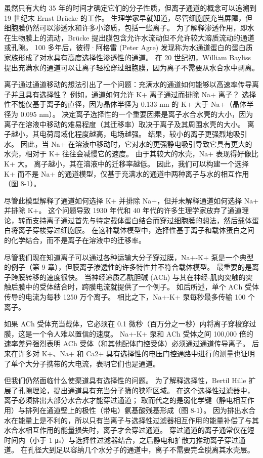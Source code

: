 虽然只有大约 35 年的时间才确定它们的分子性质，但离子通道的概念可以追溯到 19 世纪末 Ernst Brücke 的工作。 生理学家早就知道，尽管细胞膜充当屏障，但细胞膜仍然可以渗透水和许多小溶质，包括一些离子。 为了解释渗透作用，即水在生物膜上的流动，Brücke 提出膜包含允许水流动但不允许较大溶质流动的通道或孔隙。 100 多年后，彼得·阿格雷 (Peter Agre) 发现称为水通道蛋白的蛋白质家族形成了对水具有高度选择性渗透性的通道。 在 20 世纪初，William Bayliss 提出充满水的通道可以让离子轻松穿过细胞膜，因为离子不需要从水合水中剥离。

离子通过通道移动的想法引出了一个问题：充满水的通道如何能够以高速率传导离子并且具有选择性？ 例如，通道如何允许 K+ 离子通过而排除 Na+ 离子？ 选择性不能仅基于离子的直径，因为晶体半径为 0.133 nm 的 K+ 大于 Na+（晶体半径为 0.095 nm）。 决定离子选择性的一个重要因素是离子水合水壳的大小，因为离子在溶液中移动的难易程度（其迁移率）取决于离子及其周围水壳的大小。 离子越小，其电荷局域化程度越高，电场越强。 结果，较小的离子更强烈地吸引水。 因此，当 Na+ 在溶液中移动时，它对水的更强静电吸引导致它具有更大的水壳，相对于 K+ 往往会减慢它的速度。 由于其较大的水壳，Na+ 表现得好像比 K+ 大。 离子越小，其在溶液中的迁移率越低。 因此，我们可以构建一个选择 K+ 而不是 Na+ 的通道模型，仅基于充满水的通道中两种离子与水的相互作用（图 8-1）。

尽管此模型解释了通道如何选择 K+ 并排除 Na+，但并未解释通道如何选择 Na+ 并排除 K+。 这个问题导致 1930 年代和 40 年代的许多生理学家放弃了通道理论，转而支持离子通过首先与特定载体蛋白结合而穿过细胞膜的想法，然后载体蛋白将离子穿梭穿过细胞膜。 在这种载体模型中，选择性基于离子和载体蛋白之间的化学结合，而不是离子在溶液中的迁移率。

尽管我们现在知道离子可以通过各种运输大分子穿过膜，Na+-K+ 泵是一个典型的例子（第 9 章），但膜离子渗透性的许多特性并不符合载体模型。 最重要的是离子跨膜转移的速度很快。 当神经递质乙酰胆碱 (ACh) 与其在神经-肌肉突触的突触后膜中的受体结合时，跨膜电流就提供了一个例子。 如后所述，单个 ACh 受体传导的电流为每秒 1250 万个离子。 相比之下，Na+-K+ 泵每秒最多传输 100 个离子。

如果 ACh 受体充当载体，它必须在 0.1 微秒（百万分之一秒）内将离子穿梭穿过膜，这是一个令人难以置信的速度。 Na+-K+ 泵和 ACh 受体之间 100,000 倍的速率差异强烈表明 ACh 受体（和其他配体门控受体）必须通过通道传导离子。 后来在许多对 K+、Na+ 和 Ca2+ 具有选择性的电压门控通路中进行的测量也证明了单个大分子携带的大电流，表明它们也是通道。

但我们仍然面临什么使渠道具有选择性的问题。 为了解释选择性，Bertil Hille 扩展了孔隙理论，提出通道具有充当分子筛的狭窄区域。 在这个选择性过滤器中，离子必须排出大部分水合水才能穿过通道； 取而代之的是弱化学键（静电相互作用）与排列在通道壁上的极性（带电）氨基酸残基形成（图 8-1）。 因为排出水合水在能量上是不利的，所以只有当离子与选择性过滤器相互作用的能量补偿了与其水合水相互作用的能量损失时，离子才会穿过通道。 穿过通道的离子通常仅在短时间内（小于 1 μs）与选择性过滤器结合，之后静电和扩散力推动离子穿过通道。 在孔径大到足以容纳几个水分子的通道中，离子不需要完全脱离其水壳层。


